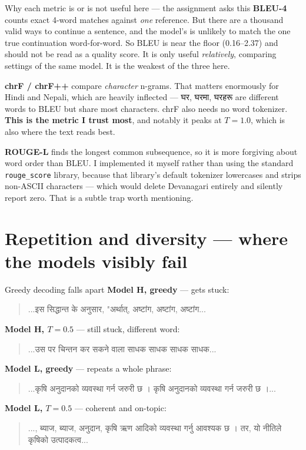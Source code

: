 \documentclass[11pt]{report}
\newcommand{\dn}[1]{{\devanagarifont #1}}
\newcommand{\p}[1]{\texttt{#1}}
\begin{document}
\begin{concept}{Why each metric is or is not useful here --- the assignment asks this}
\textbf{BLEU-4} counts exact 4-word matches against \emph{one} reference. But
there are a thousand valid ways to continue a sentence, and the model's is
unlikely to match the one true continuation word-for-word. So BLEU is near the
floor (0.16--2.37) and should not be read as a quality score. It is only useful
\emph{relatively}, comparing settings of the same model. It is the weakest of the
three here.

\textbf{chrF / chrF++} compare \emph{character} n-grams. That matters enormously
for Hindi and Nepali, which are heavily inflected --- \dn{घर}, \dn{घरमा},
\dn{घरहरू} are different words to BLEU but share most characters. chrF also needs
no word tokenizer. \textbf{This is the metric I trust most}, and notably it peaks
at $T=1.0$, which is also where the text reads best.

\textbf{ROUGE-L} finds the longest common subsequence, so it is more forgiving
about word order than BLEU. I implemented it myself rather than using the standard
\p{rouge\_score} library, because that library's default tokenizer lowercases and
strips non-ASCII characters --- which would delete Devanagari entirely and
silently report zero. That is a subtle trap worth mentioning.
\end{concept}

\section{Repetition and diversity --- where the models visibly fail}

\begin{example}{Greedy decoding falls apart}
\textbf{Model H, greedy} --- gets stuck:
\begin{quote}\dn{...इस सिद्धान्त के अनुसार, "अर्थात्, अष्टांग, अष्टांग, अष्टांग...}\end{quote}

\textbf{Model H, $T=0.5$} --- still stuck, different word:
\begin{quote}\dn{...उस पर चिन्तन कर सकने वाला साधक साधक साधक साधक...}\end{quote}

\textbf{Model L, greedy} --- repeats a whole phrase:
\begin{quote}\dn{...कृषि अनुदानको व्यवस्था गर्न जरुरी छ । कृषि अनुदानको व्यवस्था गर्न जरुरी छ ।...}\end{quote}

\textbf{Model L, $T=0.5$} --- coherent and on-topic:
\begin{quote}\dn{..., ब्याज, ब्याज, अनुदान, कृषि ऋण आदिको व्यवस्था गर्नु आवश्यक छ । तर, यो नीतिले कृषिको उत्पादकत्व...}\end{quote}
\end{example}
\end{document}
